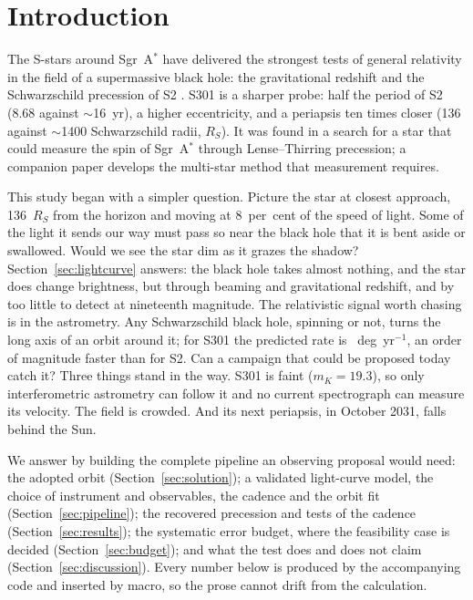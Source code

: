 \documentclass{aastex701}
\begin{document}
\section{Introduction}

The S-stars around Sgr~A$^*$ have delivered the strongest tests of general relativity in the field of a supermassive black hole: the gravitational redshift and the Schwarzschild precession of S2 \citep{gravity2018,gravity2020}. S301 \citep{gravity2026} is a sharper probe: half the period of S2 (8.68 against $\sim$16~yr), a higher eccentricity, and a periapsis ten times closer (136 against $\sim$1400 Schwarzschild radii, $R_S$). It was found in a search for a star that could measure the spin of Sgr~A$^*$ through Lense--Thirring precession; a companion paper \citep{piran2026} develops the multi-star method that measurement requires.

This study began with a simpler question. Picture the star at closest approach, 136~$R_S$ from the horizon and moving at 8~per~cent of the speed of light. Some of the light it sends our way must pass so near the black hole that it is bent aside or swallowed. Would we see the star dim as it grazes the shadow? Section~\ref{sec:lightcurve} answers: the black hole takes almost nothing, and the star does change brightness, but through beaming and gravitational redshift, and by too little to detect at nineteenth magnitude. The relativistic signal worth chasing is in the astrometry. Any Schwarzschild black hole, spinning or not, turns the long axis of an orbit around it; for S301 the predicted rate is \fitTruthOmegaDotDegYr{}~deg~yr$^{-1}$, an order of magnitude faster than for S2. Can a campaign that could be proposed today catch it? Three things stand in the way. S301 is faint ($m_K = 19.3$), so only interferometric astrometry can follow it and no current spectrograph can measure its velocity. The field is crowded. And its next periapsis, in October 2031, falls behind the Sun.

We answer by building the complete pipeline an observing proposal would need: the adopted orbit (Section~\ref{sec:solution}); a validated light-curve model, the choice of instrument and observables, the cadence and the orbit fit (Section~\ref{sec:pipeline}); the recovered precession and tests of the cadence (Section~\ref{sec:results}); the systematic error budget, where the feasibility case is decided (Section~\ref{sec:budget}); and what the test does and does not claim (Section~\ref{sec:discussion}). Every number below is produced by the accompanying code and inserted by macro, so the prose cannot drift from the calculation.
\end{document}

